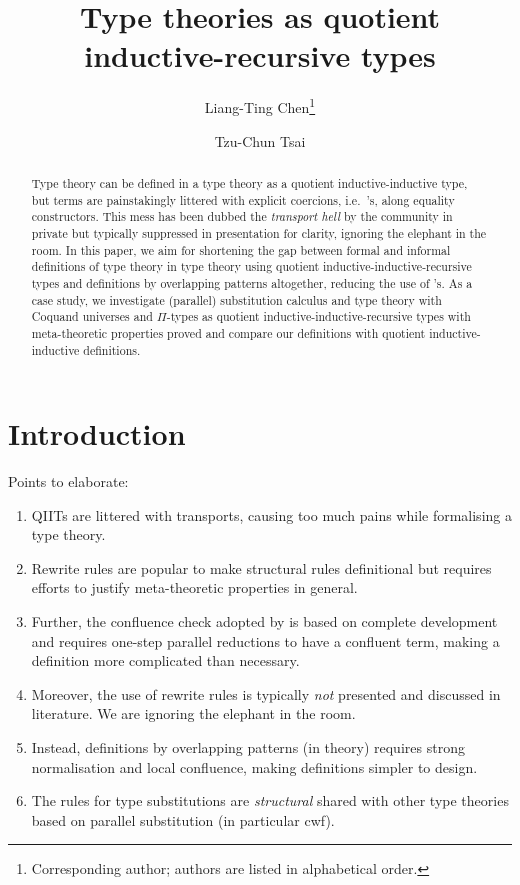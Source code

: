 \documentclass[a4paper,UKenglish,numberwithinsect,cleveref,thm-restate]{lipics-v2021}
\title{Type theories as quotient inductive-recursive types}
\author{Liang-Ting Chen\footnote{Corresponding author; authors are listed in alphabetical order.}}{Institute of Information Science, Academia Sinica, Taiwan \and \url{http://l-tchen.github.io}}{ltchen@iis.sinica.edu.tw}{https://orcid.org/0000-0002-3250-1331}{Supported by the National Science and Technology Council of Taiwan under grant NSTC [funding].}
\author{Tzu-Chun Tsai}{Institute of Information Science, Academia Sinica, Taiwan}{gene0905@icloud.com}{}{Supported by the National Science and Technology Council of Taiwan under grant NSTC 112-2221-E-001-003-MY3.}
\begin{document}
\maketitle

\begin{abstract}
  Type theory can be defined in a type theory as a quotient inductive-inductive type, but terms are painstakingly littered with explicit coercions, i.e.\ \transp's, along equality constructors.
  This mess has been dubbed the \emph{transport hell} by the community in private but typically suppressed in presentation for clarity, ignoring the elephant in the room.
  In this paper, we aim for shortening the gap between formal and informal definitions of type theory in type theory using quotient inductive-inductive-recursive types and definitions by overlapping patterns altogether, reducing the use of \transp's.
  As a case study, we investigate (parallel) substitution calculus and type theory with Coquand universes and $\Pi$-types as quotient inductive-inductive-recursive types with meta-theoretic properties proved and compare our definitions with quotient inductive-inductive definitions.
\end{abstract}

\section{Introduction} \label{sec:intro}
Points to elaborate:
\begin{enumerate}
  \item QIITs are littered with transports, causing too much pains while formalising a type theory.
  \item Rewrite rules are popular to make structural rules definitional but requires efforts to justify meta-theoretic properties in general.
  \item Further, the confluence check adopted by \Agda is based on complete development and requires one-step parallel reductions to have a confluent term, making a definition more complicated than necessary.
  \item Moreover, the use of rewrite rules is typically \emph{not} presented and discussed in literature. We are ignoring the elephant in the room.
  \item Instead, definitions by overlapping patterns (in theory) requires strong normalisation and local confluence, making definitions simpler to design.
  \item The rules for type substitutions are \emph{structural} shared with other type theories based on parallel substitution (in particular cwf).
  
\end{enumerate}
\end{document}
